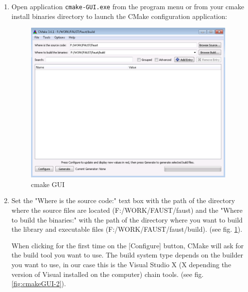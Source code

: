 \begin{enumerate}
\item Open application \texttt{cmake-GUI.exe} from the program menu or from your cmake install binaries directory  to launch the CMake configuration application:

\begin{figure}[H] %
\centering
\includegraphics[scale=0.5]{images/cmakeGUI-1-eps-converted-to.pdf}
\caption{cmake GUI}
\label{fig:cmakeGUI-1}
\end{figure}

\item Set the "Where is the source code:" text box with the path of the directory where the source files are located (F:/WORK/FAUST/faust) and the "Where to build the binaries:" with the path of the directory where you want to build the library and executable files (F:/WORK/FAUST/faust/build). (see fig.  \ref{fig:cmakeGUI-1}).

When clicking for the first time on the [Configure] button, CMake will ask for the build tool you want to use. The build system type depends on the builder you want to use, in our case this is the Visual Studio X (X depending the version of Visual installed on the computer) chain tools. (see fig. \ref{fig:cmakeGUI-2}).



\end{enumerate}
